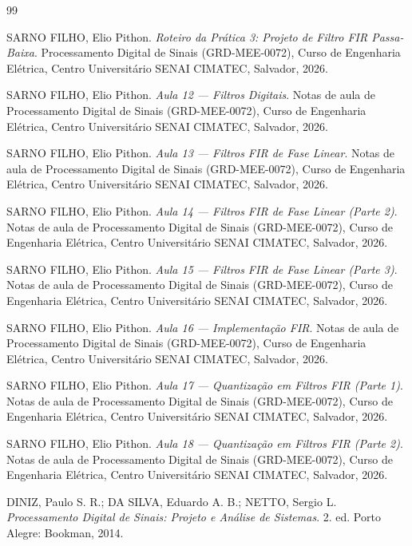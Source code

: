 \documentclass[11pt,a4paper]{article}
\begin{document}
\begin{thebibliography}{99}\setlength{\itemsep}{3pt}\setlength{\parskip}{0pt}

SARNO FILHO, Elio Pithon. \textit{Roteiro da Prática 3: Projeto de Filtro FIR Passa-Baixa}. Processamento Digital de Sinais (GRD-MEE-0072), Curso de Engenharia Elétrica, Centro Universitário SENAI CIMATEC, Salvador, 2026.

SARNO FILHO, Elio Pithon. \textit{Aula 12 --- Filtros Digitais}. Notas de aula de Processamento Digital de Sinais (GRD-MEE-0072), Curso de Engenharia Elétrica, Centro Universitário SENAI CIMATEC, Salvador, 2026.

SARNO FILHO, Elio Pithon. \textit{Aula 13 --- Filtros FIR de Fase Linear}. Notas de aula de Processamento Digital de Sinais (GRD-MEE-0072), Curso de Engenharia Elétrica, Centro Universitário SENAI CIMATEC, Salvador, 2026.

SARNO FILHO, Elio Pithon. \textit{Aula 14 --- Filtros FIR de Fase Linear (Parte 2)}. Notas de aula de Processamento Digital de Sinais (GRD-MEE-0072), Curso de Engenharia Elétrica, Centro Universitário SENAI CIMATEC, Salvador, 2026.

SARNO FILHO, Elio Pithon. \textit{Aula 15 --- Filtros FIR de Fase Linear (Parte 3)}. Notas de aula de Processamento Digital de Sinais (GRD-MEE-0072), Curso de Engenharia Elétrica, Centro Universitário SENAI CIMATEC, Salvador, 2026.

SARNO FILHO, Elio Pithon. \textit{Aula 16 --- Implementação FIR}. Notas de aula de Processamento Digital de Sinais (GRD-MEE-0072), Curso de Engenharia Elétrica, Centro Universitário SENAI CIMATEC, Salvador, 2026.

SARNO FILHO, Elio Pithon. \textit{Aula 17 --- Quantização em Filtros FIR (Parte 1)}. Notas de aula de Processamento Digital de Sinais (GRD-MEE-0072), Curso de Engenharia Elétrica, Centro Universitário SENAI CIMATEC, Salvador, 2026.

SARNO FILHO, Elio Pithon. \textit{Aula 18 --- Quantização em Filtros FIR (Parte 2)}. Notas de aula de Processamento Digital de Sinais (GRD-MEE-0072), Curso de Engenharia Elétrica, Centro Universitário SENAI CIMATEC, Salvador, 2026.

DINIZ, Paulo S. R.; DA SILVA, Eduardo A. B.; NETTO, Sergio L. \textit{Processamento Digital de Sinais: Projeto e Análise de Sistemas}. 2. ed. Porto Alegre: Bookman, 2014.


\end{thebibliography}
\end{document}

